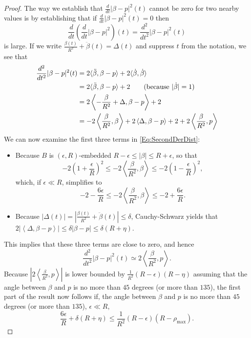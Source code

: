 \documentclass[twoside,leqno]{article}
\begin{document}
\begin{proof}
The way we establish that $\frac{d}{dt} | \beta - p|^2 (t) $ cannot be zero for two nearby values is by establishing that if $\frac{d}{dt} | \beta - p|^2 (t) =0 $  then  
\[
\frac{d}{dt} \left(\frac{d}{dt} | \beta - p|^2 \right) (t) = \frac{d^2}{dt^2} | \beta - p|^2  (t) 
\]
is large. 
If we write $\frac{\beta (t)}{R^2} +  \ddot{\beta} (t)= \Delta(t)$ and suppress $t$ from the notation, we see that 
\begin{align}
     \frac{d^2}{dt^2} | \beta - p|^2  (t) &= 2 \langle
     \ddot{\beta} , \beta -p \rangle  + 2 \langle  \dot{\beta} , \dot{ \beta} \rangle 
     \nonumber 
     \\ 
     &= 2 \langle
     \ddot{\beta} , \beta -p \rangle  + 2 \tag{because $|\dot{\beta} |=1$}
     \\
     &= 2 \left \langle - \frac{\beta}{R^2}  + \Delta , \beta -p \right \rangle  +2
     \nonumber
     \\
     &=   -2 \left \langle \frac{\beta}{R^2} , \beta \right \rangle  +2 \left \langle \Delta, \beta -p \right \rangle +2  +2 \left \langle \frac{\beta}{R^2} , p \right \rangle 
     \label{Eq:SecondDerDist}
\end{align}
We can now examine the first three terms in \eqref{Eq:SecondDerDist}: 
\begin{itemize} 
\item Because $B$ is $(\epsilon,R)$-embedded $R-\epsilon\leq  |\beta| \leq R+\epsilon$, so that 
\[ -2 \left (1+\frac{\epsilon}{R} \right )^2  \leq  -2 \left \langle \frac{\beta}{R^2} , \beta \right \rangle \leq -2 \left (1-\frac{\epsilon}{R} \right )^2,
\]
which, if $\epsilon \ll R $, simplifies to 
\[ -2 -\frac{6\epsilon}{R}  \leq  -2 \left \langle \frac{\beta}{R^2} , \beta \right \rangle \leq -2 +\frac{6\epsilon}{R} .
\]
\item Because $|\Delta(t)| = |\frac{\beta (t)}{R^2} +  \ddot{\beta} (t)| \leq \delta$, Cauchy-Schwarz yields that 
$ 2| \left \langle \Delta, \beta -p \right \rangle |\leq \delta |\beta- p| \leq \delta (R+\eta)$.  
\end{itemize}
This implies that these three terms are close to zero,  and hence %
\[
\frac{d^2}{dt^2} | \beta - p|^2  (t) \simeq  2 \left \langle \frac{\beta}{R^2} , p \right \rangle .
\]
Because $\left |2 \left \langle \frac{\beta}{R^2} , p \right \rangle \right|$ is lower bounded by
$\frac{1}{R^2} ( R- \epsilon) ( R- \eta) $
assuming that the angle between $\beta$ and $p$ is no more than $45$ degrees (or more than $135$), 
the first part of the result now follows if, the angle between $\beta$ and $p$ is no more than $45$ degrees (or more than $135$), $\epsilon \ll R$,  
\[ 
\frac{6\epsilon}{R} + \delta (R+\eta) \leq \frac{1}{R^2} ( R- \epsilon) ( R- \rho_{\max}) . 
\] 




\end{proof}
\end{document}
